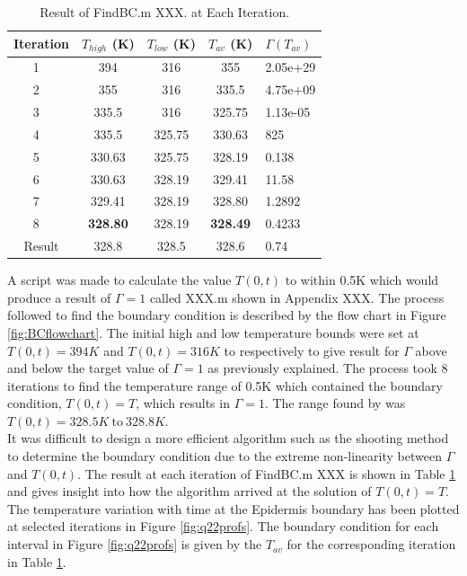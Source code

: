 \documentclass[11pt]{article}
\newcommand{\ra}[1]{\renewcommand{\arraystretch}{#1}}
\begin{document}
\begin{table}[!h]
\centering %
\ra{1.3}
\begin{tabular}{@{}ccccl@{}}\toprule
 Iteration  & $T_{high}$ (K) & $T_{low}$ (K) &  $T_{av}$ (K) & $\Gamma (T_{av}) $ \\
\midrule
1 \   & 394 & 316  &  355  &  2.05e+29\\
2 \   & 355 & 316  &  335.5  & 4.75e+09 \\
3 \   & 335.5 & 316  &  325.75  &  1.13e-05 \\
4 \   & 335.5 & 325.75  & 330.63  & 825 \\
5 \   & 330.63 & 325.75  &  328.19  & 0.138 \\
6 \   & 330.63 & 328.19  & 329.41  &  11.58\\
7 \   & 329.41 & 328.19  &  328.80  & 1.2892  \\
8 \   & \textbf{328.80} & 328.19  &  \textbf{328.49}  & 0.4233  \\
\midrule
Result & 328.8 & 328.5 & 328.6 & 0.74\\
\bottomrule
\end{tabular}
\caption{Result of FindBC.m XXX. at Each Iteration.}
\label{table:findbc}
\end{table}

A script was made to calculate the value $T(0,t)$ to within 0.5K which would produce a result of $\Gamma = 1$ called XXX.m shown in Appendix XXX. The process followed to find the boundary condition is described by the flow chart in Figure \ref{fig:BCflowchart}. The initial high and low temperature bounds were set at $T(0, t) = 394K$ and $T(0, t) = 316K$ to respectively to give result for $\Gamma$ above and below the target value of $\Gamma = 1$ as previously explained. The process took 8 iterations to find the temperature range of 0.5K which contained the boundary condition, $T(0, t) =T$, which results in $\Gamma = 1$. The range found by was $T(0,t) = 328.5K \ \text{to} \ 328.8K$. \\
 It was difficult to design a more efficient algorithm such as the shooting method to determine the boundary condition due to the extreme non-linearity between $\Gamma$ and $T(0,t)$. The result at each iteration of FindBC.m XXX is shown in Table \ref{table:findbc} and gives insight into how the algorithm arrived at the solution of $T(0, t) =T$. The temperature variation with time at the Epidermis boundary has been plotted at selected iterations in Figure \ref{fig:q22profs}. The boundary condition for each interval in Figure \ref{fig:q22profs} is given by the $T_{av}$ for the corresponding iteration in Table \ref{table:findbc}.
\end{document}
